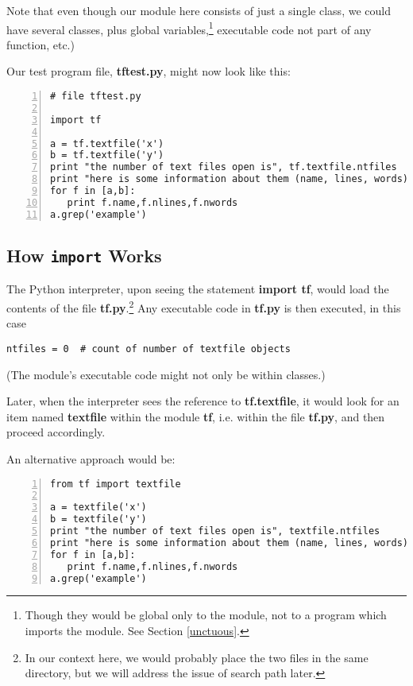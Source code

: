 Note that even though our module here consists of just a single class,
we could have several classes, plus global variables,\footnote{Though
they would be global only to the module, not to a program which imports
the module.  See Section \ref{unctuous}.} executable code not part of
any function, etc.)

Our test program file, {\bf tftest.py}, might now look like this:

\begin{Verbatim}[fontsize=\relsize{-2},numbers=left]
# file tftest.py

import tf

a = tf.textfile('x')
b = tf.textfile('y')
print "the number of text files open is", tf.textfile.ntfiles
print "here is some information about them (name, lines, words):"
for f in [a,b]:
   print f.name,f.nlines,f.nwords
a.grep('example')
\end{Verbatim}

\subsection{How {\tt import} Works}
\label{import}

The Python interpreter, upon seeing the statement {\bf import tf}, would
load the contents of the file {\bf tf.py}.\footnote{In our context here,
we would probably place the two files in the same directory, but we will 
address the issue of search path later.}  Any executable code in {\bf
tf.py} is then executed, in this case

\begin{Verbatim}[fontsize=\relsize{-2}]
ntfiles = 0  # count of number of textfile objects
\end{Verbatim}

(The module's executable code might not only be within classes.)

Later, when the interpreter sees the reference to {\bf tf.textfile}, it
would look for an item named {\bf textfile} within the module {\bf tf}, 
i.e. within the file {\bf tf.py}, and then proceed accordingly.

An alternative approach would be:

\begin{Verbatim}[fontsize=\relsize{-2},numbers=left]
from tf import textfile

a = textfile('x')
b = textfile('y')
print "the number of text files open is", textfile.ntfiles
print "here is some information about them (name, lines, words):"
for f in [a,b]:
   print f.name,f.nlines,f.nwords
a.grep('example')
\end{Verbatim}

